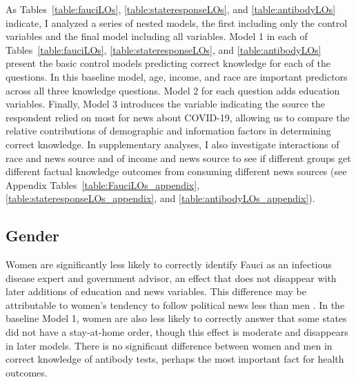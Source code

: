 \documentclass[11pt]{article}
\begin{document}


As Tables~\ref{table:fauciLOs}, \ref{table:stateresponseLOs}, and \ref{table:antibodyLOs} indicate, I analyzed a series of nested models, the first including only the control variables and the final model including all variables. Model 1 in each of Tables~\ref{table:fauciLOs}, \ref{table:stateresponseLOs}, and \ref{table:antibodyLOs} present the basic control models predicting correct knowledge for each of the questions. In this baseline model, age, income, and race are important predictors across all three knowledge questions. Model 2 for each question adds education variables. Finally, Model 3 introduces the variable indicating the source the respondent relied on most for news about COVID-19, allowing us to compare the relative contributions of demographic and information factors in determining correct knowledge. In supplementary analyses, I also investigate interactions of race and news source and of income and news source to see if different groups get different factual knowledge outcomes from consuming different news sources (see Appendix Tables~\ref{table:FauciLOs_appendix}, \ref{table:stateresponseLOs_appendix}, and \ref{table:antibodyLOs_appendix}).






 

 



\subsection{Gender}\label{sec:gender}

Women are significantly less likely to correctly identify Fauci as an infectious disease expert and government advisor, an effect that does not disappear with later additions of education and news variables. This difference may be attributable to women's tendency to follow political news less than men \citep{Verba1997}. In the baseline Model 1, women are also less likely to correctly answer that some states did not have a stay-at-home order, though this effect is moderate and disappears in later models. There is no significant difference between women and men in correct knowledge of antibody tests, perhaps the most important fact for health outcomes. 
\end{document}
